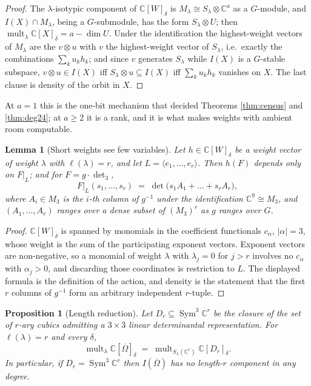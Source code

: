 \documentclass[11pt,reqno]{amsart}
\theoremstyle{plain}
\newtheorem{proposition}[theorem]{Proposition}
\newtheorem{lemma}[theorem]{Lemma}
\theoremstyle{definition}
\DeclareMathOperator{\Sym}{Sym}
\DeclareMathOperator{\mult}{mult}
\newcommand{\cO}{\overline{\Omega}}
\newcommand{\bC}{\mathbb{C}}
\begin{document}
\begin{proof}
The $\lambda$-isotypic component of $\bC[W]_\delta$ is $M_\lambda\cong
S_\lambda\otimes\bC^{a}$ as a $G$-module, and $I(X)\cap M_\lambda$, being a
$G$-submodule, has the form $S_\lambda\otimes U$; then
$\mult_\lambda\bC[X]_\delta=a-\dim U$.  Under the identification the
highest-weight vectors of $M_\lambda$ are the $v\otimes u$ with $v$ the
highest-weight vector of $S_\lambda$, i.e.\ exactly the combinations
$\sum_ku_kh_k$; and since $v$ generates $S_\lambda$ while $I(X)$ is a
$G$-stable subspace, $v\otimes u\in I(X)$ iff $S_\lambda\otimes u\subseteq
I(X)$ iff $\sum_ku_kh_k$ vanishes on $X$.  The last clause is density of the
orbit in $X$.
\end{proof}

At $a=1$ this is the one-bit mechanism that decided Theorems \ref{thm:census}
and \ref{thm:deg24}; at $a\ge2$ it is a rank, and it is what makes weights
with ambient room computable.

\begin{lemma}[Short weights see few variables]\label{lem:short}
Let $h\in\bC[W]_\delta$ be a weight vector of weight $\lambda$ with
$\ell(\lambda)=r$, and let $L=\langle e_1,\dots,e_r\rangle$.  Then $h(F)$
depends only on $F|_L$; and for $F=g\cdot\det_3$,
\[
  F|_L(s_1,\dots,s_r)\;=\;\det\big(s_1A_1+\dots+s_rA_r\big),
\]
where $A_i\in M_3$ is the $i$-th column of $g^{-1}$ under the identification
$\bC^{9}\cong M_3$, and $(A_1,\dots,A_r)$ ranges over a dense subset of
$(M_3)^{r}$ as $g$ ranges over $G$.
\end{lemma}

\begin{proof}
$\bC[W]_\delta$ is spanned by monomials in the coefficient functionals
$c_\alpha$, $|\alpha|=3$, whose weight is the sum of the participating
exponent vectors.  Exponent vectors are non-negative, so a monomial of weight
$\lambda$ with $\lambda_j=0$ for $j>r$ involves no $c_\alpha$ with
$\alpha_j>0$, and discarding those coordinates is restriction to $L$.  The
displayed formula is the definition of the action, and density is the
statement that the first $r$ columns of $g^{-1}$ form an arbitrary independent
$r$-tuple.
\end{proof}

\begin{proposition}[Length reduction]\label{prop:lengthred}
Let $D_r\subseteq\Sym^{3}\bC^{r}$ be the closure of the set of $r$-ary cubics
admitting a $3\times3$ linear determinantal representation.  For
$\ell(\lambda)=r$ and every $\delta$,
\[
  \mult_\lambda\bC[\cO]_\delta\;=\;\mult_{S_\lambda(\bC^{r})}\bC[D_r]_\delta .
\]
In particular, if $D_r=\Sym^{3}\bC^{r}$ then $I(\cO)$ has no length-$r$
component in any degree.
\end{proposition}
\end{document}
